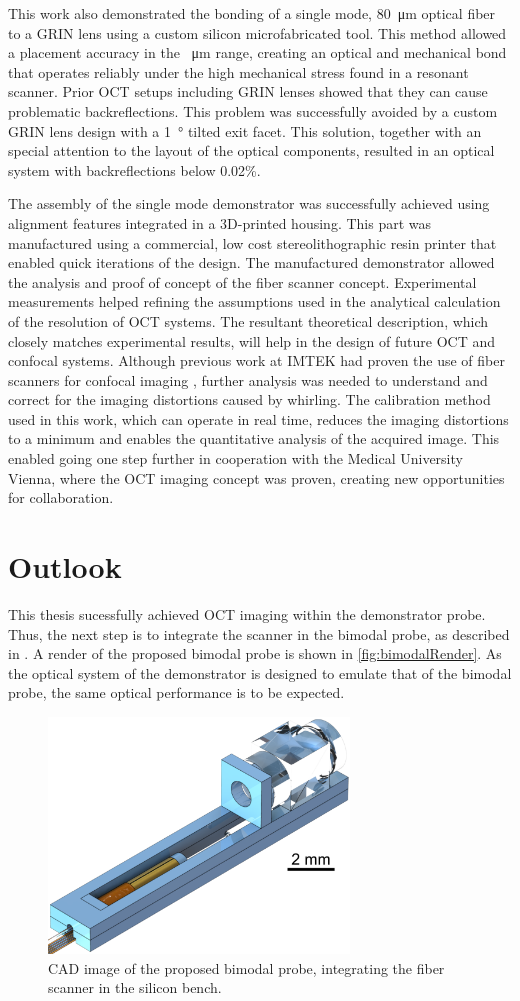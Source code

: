 This work also demonstrated the bonding of a single mode, \SI{80}{\micro\meter} optical fiber to a GRIN lens using a custom silicon microfabricated tool. This method allowed a placement accuracy in the \SI{}{\micro\meter} range, creating an optical and mechanical bond that operates reliably under the high mechanical stress found in a resonant scanner. Prior OCT setups including GRIN lenses showed that they can cause problematic backreflections. This problem was successfully avoided by a custom GRIN lens design with a \SI{1}{\degree} tilted exit facet. This solution, together with an special attention to the layout of the optical components, resulted in an optical system with backreflections below 0.02\%.

The assembly of the single mode demonstrator was successfully achieved using alignment features integrated in a 3D-printed housing. This part was manufactured using a commercial, low cost stereolithographic resin printer that enabled quick iterations of the design. The manufactured demonstrator allowed the analysis and proof of concept of the fiber scanner concept. Experimental measurements helped refining the assumptions used in the analytical calculation of the resolution of OCT systems. The resultant theoretical description, which closely matches experimental results, will help in the design of future OCT and confocal systems. Although previous work at IMTEK had proven the use of fiber scanners for confocal imaging \cite{Meinert}, further analysis was needed to understand and correct for the imaging distortions caused by whirling. The calibration method used in this work, which can operate in real time, reduces the imaging distortions to a minimum and enables the quantitative analysis of the acquired image. This enabled going one step further in cooperation with the Medical University Vienna, where the OCT imaging concept was proven, creating new opportunities for collaboration. 

\section{Outlook}
This thesis sucessfully achieved OCT imaging within the demonstrator probe. Thus, the next step is to integrate the scanner in the bimodal probe, as described in \cite{vilches}. A render of the proposed bimodal probe is shown in \autoref{fig:bimodalRender}. As the optical system of the demonstrator is designed to emulate that of the bimodal probe, the same optical performance is to be expected. 

\begin{figure}[h!]\centering
      \includegraphics[width = 8cm]{figures/60_Conclusion/bimodalRender.png}
      \caption{CAD image of the proposed bimodal probe, integrating the fiber scanner in the silicon bench. \cite{vilches} }
      \label{fig:bimodalRender}
\end{figure}

